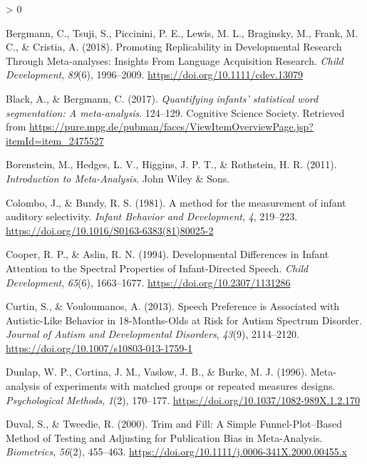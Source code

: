 \documentclass[
  english,
  man]{apa6}
\newlength{\cslhangindent}
\newenvironment{CSLReferences}[2] %
 {%
  \setlength{\parindent}{0pt}
  \ifodd #1 \everypar{\setlength{\hangindent}{\cslhangindent}}\ignorespaces\fi
  \ifnum #2 > 0
  \setlength{\parskip}{#2\baselineskip}
  \fi
 }%
 {}
\begin{document}
\hypertarget{refs}{}
\begin{CSLReferences}{1}{0}
\leavevmode\hypertarget{ref-bergmann_promoting_2018}{}%
Bergmann, C., Tsuji, S., Piccinini, P. E., Lewis, M. L., Braginsky, M., Frank, M. C., \& Cristia, A. (2018). Promoting {Replicability} in {Developmental} {Research} {Through} {Meta}-analyses: {Insights} {From} {Language} {Acquisition} {Research}. \emph{Child Development}, \emph{89}(6), 1996--2009. \url{https://doi.org/10.1111/cdev.13079}

\leavevmode\hypertarget{ref-black_quantifying_2017}{}%
Black, A., \& Bergmann, C. (2017). \emph{Quantifying infants' statistical word segmentation: {A} meta-analysis}. 124--129. Cognitive Science Society. Retrieved from \url{https://pure.mpg.de/pubman/faces/ViewItemOverviewPage.jsp?itemId=item_2475527}

\leavevmode\hypertarget{ref-borenstein_introduction_2011}{}%
Borenstein, M., Hedges, L. V., Higgins, J. P. T., \& Rothstein, H. R. (2011). \emph{Introduction to {Meta}-{Analysis}}. John Wiley \& Sons.

\leavevmode\hypertarget{ref-colombo_method_1981}{}%
Colombo, J., \& Bundy, R. S. (1981). A method for the measurement of infant auditory selectivity. \emph{Infant Behavior and Development}, \emph{4}, 219--223. \url{https://doi.org/10.1016/S0163-6383(81)80025-2}

\leavevmode\hypertarget{ref-cooper_developmental_1994}{}%
Cooper, R. P., \& Aslin, R. N. (1994). Developmental {Differences} in {Infant} {Attention} to the {Spectral} {Properties} of {Infant}-{Directed} {Speech}. \emph{Child Development}, \emph{65}(6), 1663--1677. \url{https://doi.org/10.2307/1131286}

\leavevmode\hypertarget{ref-curtin_speech_2013}{}%
Curtin, S., \& Vouloumanos, A. (2013). Speech {Preference} is {Associated} with {Autistic}-{Like} {Behavior} in 18-{Months}-{Olds} at {Risk} for {Autism} {Spectrum} {Disorder}. \emph{Journal of Autism and Developmental Disorders}, \emph{43}(9), 2114--2120. \url{https://doi.org/10.1007/s10803-013-1759-1}

\leavevmode\hypertarget{ref-dunlap_meta-analysis_1996}{}%
Dunlap, W. P., Cortina, J. M., Vaslow, J. B., \& Burke, M. J. (1996). Meta-analysis of experiments with matched groups or repeated measures designs. \emph{Psychological Methods}, \emph{1}(2), 170--177. \url{https://doi.org/10.1037/1082-989X.1.2.170}

\leavevmode\hypertarget{ref-duval_trim_2000}{}%
Duval, S., \& Tweedie, R. (2000). Trim and {Fill}: {A} {Simple} {Funnel}-{Plot}--{Based} {Method} of {Testing} and {Adjusting} for {Publication} {Bias} in {Meta}-{Analysis}. \emph{Biometrics}, \emph{56}(2), 455--463. \url{https://doi.org/10.1111/j.0006-341X.2000.00455.x}


\end{CSLReferences}
\end{document}
